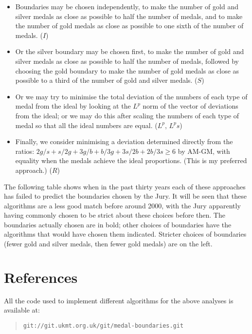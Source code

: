 \documentclass[a4paper,11pt]{article}
\begin{document}
\begin{itemize}
\item Boundaries may be chosen independently, to make the number of
  gold and silver medals as close as possible to half the number of
  medals, and to make the number of gold medals as close as possible
  to one sixth of the number of medals.  ($I$)
\item Or the silver boundary may be chosen first, to make the number
  of gold and silver medals as close as possible to half the number of
  medals, followed by choosing the gold boundary to make the number of
  gold medals as close as possible to a third of the number of gold
  and silver medals.  ($S$)
\item Or we may try to minimise the total deviation of the numbers of
  each type of medal from the ideal by looking at the $L^p$ norm of
  the vector of deviations from the ideal; or we may do this after
  scaling the numbers of each type of medal so that all the ideal
  numbers are equal.  ($L^p$, $L^ps$)
\item Finally, we consider minimising a deviation determined directly
  from the ratios: $2g/s + s/2g + 3g/b + b/3g + 3s/2b + 2b/3s \ge 6$
  by AM-GM, with equality when the medals achieve the ideal
  proportions.  (This is my preferred approach.)  ($R$)
\end{itemize}

The following table shows when in the past thirty years each of these
approaches has failed to predict the boundaries chosen by the Jury.
It will be seen that these algorithms are a less good match before
around 2000, with the Jury apparently having commonly chosen to be
strict about these choices before then.  The boundaries actually
chosen are in bold; other choices of boundaries have the algorithms
that would have chosen them indicated.  Stricter choices of boundaries
(fewer gold and silver medals, then fewer gold medals) are on the
left.



\section*{References}

All the code used to implement different algorithms for the above
analyses is available at:

\begin{quote}
\texttt{git://git.ukmt.org.uk/git/medal-boundaries.git}
\end{quote}
\end{document}
